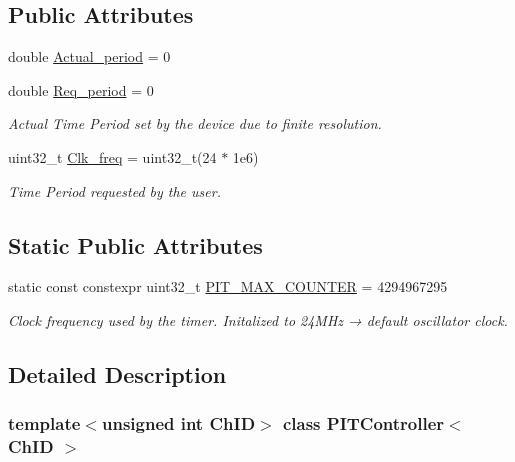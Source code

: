\subsection*{Public Attributes}
\begin{DoxyCompactItemize}
\item 
double \hyperlink{classPITController_a549601e7c66941d7872a6e7d38ed9563}{Actual\+\_\+period} = 0
\item 
double \hyperlink{classPITController_a9de0af49a52145c8d2a8f4e90a519b60}{Req\+\_\+period} = 0
\begin{DoxyCompactList}\small\item\em Actual Time Period set by the device due to finite resolution. \end{DoxyCompactList}\item 
uint32\+\_\+t \hyperlink{classPITController_ae3d74bb18e5b22769e895f592cb16129}{Clk\+\_\+freq} = uint32\+\_\+t(24 $\ast$ 1e6)
\begin{DoxyCompactList}\small\item\em Time Period requested by the user. \end{DoxyCompactList}\end{DoxyCompactItemize}
\subsection*{Static Public Attributes}
\begin{DoxyCompactItemize}
\item 
static const constexpr uint32\+\_\+t \hyperlink{classPITController_a53778fe7e47ac9741bef0bc190e0646a}{P\+I\+T\+\_\+\+M\+A\+X\+\_\+\+C\+O\+U\+N\+T\+ER} = 4294967295
\begin{DoxyCompactList}\small\item\em Clock frequency used by the timer. Initalized to 24\+M\+Hz → default oscillator clock. \end{DoxyCompactList}\end{DoxyCompactItemize}


\subsection{Detailed Description}
\subsubsection*{template$<$unsigned int Ch\+ID$>$\newline
class P\+I\+T\+Controller$<$ Ch\+I\+D $>$}

